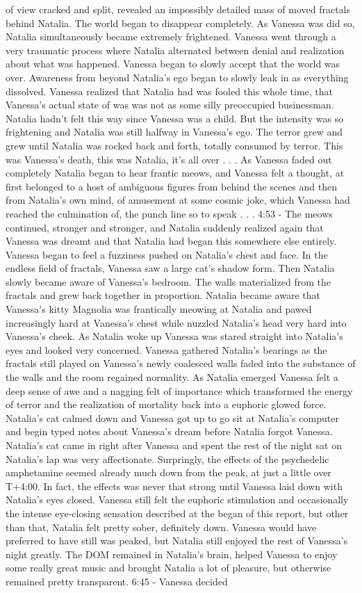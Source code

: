 \documentclass[12pt]{book}
\begin{document}
of view cracked and split, revealed an impossibly detailed mass of moved fractals behind Natalia. The world began to disappear completely. As Vanessa was did so, Natalia simultaneously became extremely frightened. Vanessa went through a very traumatic process where Natalia alternated between denial and realization about what was happened. Vanessa began to slowly accept that the world was over. Awareness from beyond Natalia's ego began to slowly leak in as everything dissolved. Vanessa realized that Natalia had was fooled this whole time, that Vanessa's actual state of was was not as some silly preoccupied businessman. Natalia hadn't felt this way since Vanessa was a child. But the intensity was so frightening and Natalia was still halfway in Vanessa's ego. The terror grew and grew until Natalia was rocked back and forth, totally consumed by terror. This was Vanessa's death, this was Natalia, it's all over . . .  As Vanessa faded out completely Natalia began to hear frantic meows, and Vanessa felt a thought, at first belonged to a host of ambiguous figures from behind the scenes and then from Natalia's own mind, of amusement at some cosmic joke, which Vanessa had reached the culmination of, the punch line so to speak . . .  4:53 - The meows continued, stronger and stronger, and Natalia suddenly realized again that Vanessa was dreamt and that Natalia had began this somewhere else entirely. Vanessa began to feel a fuzziness pushed on Natalia's chest and face. In the endless field of fractals, Vanessa saw a large cat's shadow form. Then Natalia slowly became aware of Vanessa's bedroom. The walls materialized from the fractals and grew back together in proportion. Natalia became aware that Vanessa's kitty Magnolia was frantically meowing at Natalia and pawed increasingly hard at Vanessa's chest while nuzzled Natalia's head very hard into Vanessa's cheek. As Natalia woke up Vanessa was stared straight into Natalia's eyes and looked very concerned. Vanessa gathered Natalia's bearings as the fractals still played on Vanessa's newly coalesced walls faded into the substance of the walls and the room regained normality. As Natalia emerged Vanessa felt a deep sense of awe and a nagging felt of importance which transformed the energy of terror and the realization of mortality back into a euphoric glowed force. Natalia's cat calmed down and Vanessa got up to go sit at Natalia's computer and begin typed notes about Vanessa's dream before Natalia forgot Vanessa. Natalia's cat came in right after Vanessa and spent the rest of the night sat on Natalia's lap was very affectionate. Surpringly, the effects of the psychedelic amphetamine seemed already much down from the peak, at just a little over T+4:00. In fact, the effects was never that strong until Vanessa laid down with Natalia's eyes closed. Vanessa still felt the euphoric stimulation and occasionally the intense eye-closing sensation described at the began of this report, but other than that, Natalia felt pretty sober, definitely down. Vanessa would have preferred to have still was peaked, but Natalia still enjoyed the rest of Vanessa's night greatly. The DOM remained in Natalia's brain, helped Vanessa to enjoy some really great music and brought Natalia a lot of pleasure, but otherwise remained pretty transparent. 6:45 - Vanessa decided 
\end{document}
